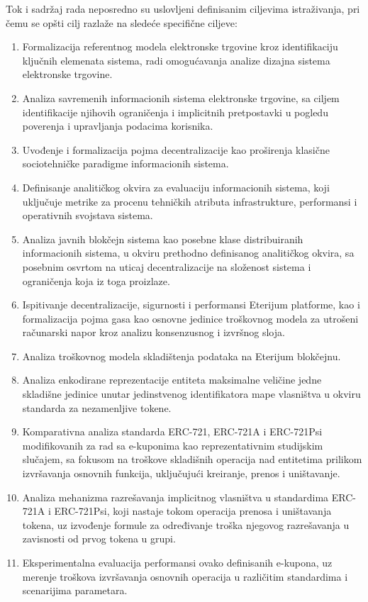 Tok i sadržaj rada neposredno su uslovljeni definisanim ciljevima istraživanja, pri čemu se opšti cilj razlaže na sledeće specifične ciljeve:
\begin{enumerate}
\item Formalizacija referentnog modela elektronske trgovine kroz identifikaciju ključnih elemenata sistema, radi omogućavanja analize dizajna sistema elektronske trgovine.
\item Analiza savremenih informacionih sistema elektronske trgovine, sa ciljem identifikacije njihovih ograničenja i implicitnih pretpostavki u pogledu poverenja i upravljanja podacima korisnika.
\item Uvođenje i formalizacija pojma decentralizacije kao proširenja klasične sociotehničke paradigme informacionih sistema.
\item Definisanje analitičkog okvira za evaluaciju informacionih sistema, koji uključuje metrike za procenu tehničkih atributa infrastrukture, performansi i operativnih svojstava sistema.
\item Analiza javnih blokčejn sistema kao posebne klase distribuiranih informacionih sistema, u okviru prethodno definisanog analitičkog okvira, sa posebnim osvrtom na uticaj decentralizacije na složenost sistema i ograničenja koja iz toga proizlaze.
\item Ispitivanje decentralizacije, sigurnosti i performansi Eterijum platforme, kao i formalizacija pojma gasa kao osnovne jedinice troškovnog modela za utrošeni računarski napor kroz analizu konsenzusnog i izvršnog sloja.
\item Analiza troškovnog modela skladištenja podataka na Eterijum blokčejnu.
\item Analiza enkodirane reprezentacije entiteta maksimalne veličine jedne skladišne jedinice unutar jedinstvenog identifikatora mape vlasništva u okviru standarda za nezamenljive tokene.
\item Komparativna analiza standarda ERC-721, ERC-721A i ERC-721Psi modifikovanih za rad sa e-kuponima kao reprezentativnim studijskim slučajem, sa fokusom na troškove skladišnih operacija nad entitetima prilikom izvršavanja osnovnih funkcija, uključujući kreiranje, prenos i uništavanje.
\item Analiza mehanizma razrešavanja implicitnog vlasništva u standardima ERC-721A i ERC-721Psi, koji nastaje tokom operacija prenosa i uništavanja tokena, uz izvođenje formule za određivanje troška njegovog razrešavanja u zavisnosti od prvog tokena u grupi.
\item Eksperimentalna evaluacija performansi ovako definisanih e-kupona, uz merenje troškova izvršavanja osnovnih operacija u različitim standardima i scenarijima parametara.

\end{enumerate}

